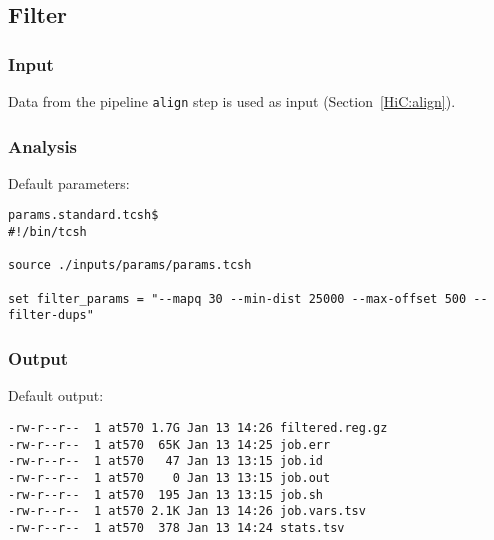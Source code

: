 \subsection{Filter}\label{HiC:filter} %
\subsubsection{Input} %
Data from the pipeline \texttt{align} step is used as input (Section~\ref{HiC:align}).
\subsubsection{Analysis} %
Default parameters:
\begin{lstlisting}
params.standard.tcsh$
#!/bin/tcsh

source ./inputs/params/params.tcsh

set filter_params = "--mapq 30 --min-dist 25000 --max-offset 500 --filter-dups"
\end{lstlisting}
\subsubsection{Output} %
Default output: %
\begin{lstlisting}
-rw-r--r--  1 at570 1.7G Jan 13 14:26 filtered.reg.gz
-rw-r--r--  1 at570  65K Jan 13 14:25 job.err
-rw-r--r--  1 at570   47 Jan 13 13:15 job.id
-rw-r--r--  1 at570    0 Jan 13 13:15 job.out
-rw-r--r--  1 at570  195 Jan 13 13:15 job.sh
-rw-r--r--  1 at570 2.1K Jan 13 14:26 job.vars.tsv
-rw-r--r--  1 at570  378 Jan 13 14:24 stats.tsv
\end{lstlisting}
% 
\clearpage